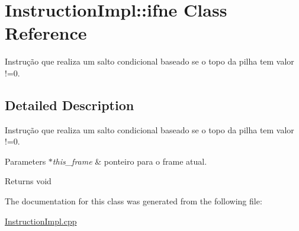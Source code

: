 \hypertarget{class_instruction_impl_1_1ifne}{}\section{Instruction\+Impl\+:\+:ifne Class Reference}
\label{class_instruction_impl_1_1ifne}


Instrução que realiza um salto condicional baseado se o topo da pilha tem valor !=0.  




\subsection{Detailed Description}
Instrução que realiza um salto condicional baseado se o topo da pilha tem valor !=0. 


\begin{DoxyParams}{Parameters}
{\em $\ast$this\+\_\+frame} & ponteiro para o frame atual. \\
\hline
\end{DoxyParams}
\begin{DoxyReturn}{Returns}
void 
\end{DoxyReturn}


The documentation for this class was generated from the following file\+:\begin{DoxyCompactItemize}
\item 
\hyperlink{_instruction_impl_8cpp}{Instruction\+Impl.\+cpp}\end{DoxyCompactItemize}
